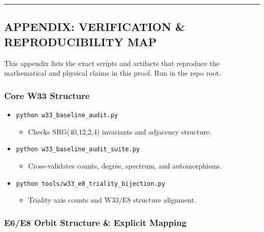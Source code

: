 \documentclass[11pt]{article}
\providecommand{\tightlist}{%
  \setlength{\itemsep}{0pt}\setlength{\parskip}{0pt}}
\begin{document}
\begin{center}\rule{0.5\linewidth}{0.5pt}\end{center}

\subsection{APPENDIX: VERIFICATION \& REPRODUCIBILITY
MAP}\label{appendix-verification-reproducibility-map}

This appendix lists the exact scripts and artifacts that reproduce the
mathematical and physical claims in this proof. Run in the repo root.

\subsubsection{Core W33 Structure}\label{core-w33-structure}

\begin{itemize}
\tightlist
\item
  \texttt{python\ w33\_baseline\_audit.py}

  \begin{itemize}
  \tightlist
  \item
    Checks SRG(40,12,2,4) invariants and adjacency structure.
  \end{itemize}
\item
  \texttt{python\ w33\_baseline\_audit\_suite.py}

  \begin{itemize}
  \tightlist
  \item
    Cross-validates counts, degree, spectrum, and automorphisms.
  \end{itemize}
\item
  \texttt{python\ tools/w33\_e8\_triality\_bijection.py}

  \begin{itemize}
  \tightlist
  \item
    Triality axis counts and W33/E8 structure alignment.
  \end{itemize}
\end{itemize}

\subsubsection{E6/E8 Orbit Structure \& Explicit
Mapping}\label{e6e8-orbit-structure-explicit-mapping}
\end{document}
